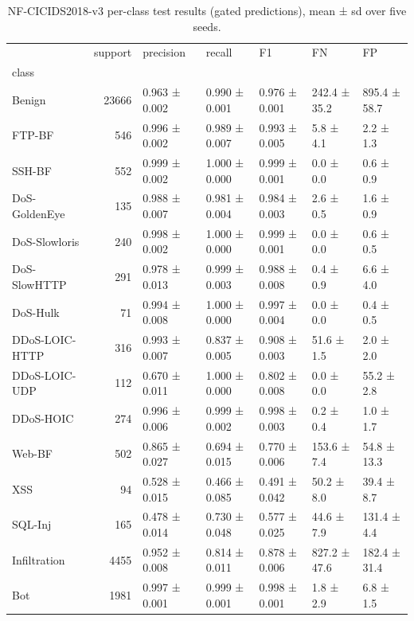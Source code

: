 \begin{table}
\caption{NF-CICIDS2018-v3 per-class test results (gated predictions), mean ± sd over five seeds.}
\label{tab:table2_per_class_gated}
\begin{tabular}{lrlllll}
\toprule
 & support & precision & recall & F1 & FN & FP \\
class &  &  &  &  &  &  \\
\midrule
Benign & 23666 & 0.963 ± 0.002 & 0.990 ± 0.001 & 0.976 ± 0.001 & 242.4 ± 35.2 & 895.4 ± 58.7 \\
FTP-BF & 546 & 0.996 ± 0.002 & 0.989 ± 0.007 & 0.993 ± 0.005 & 5.8 ± 4.1 & 2.2 ± 1.3 \\
SSH-BF & 552 & 0.999 ± 0.002 & 1.000 ± 0.000 & 0.999 ± 0.001 & 0.0 ± 0.0 & 0.6 ± 0.9 \\
DoS-GoldenEye & 135 & 0.988 ± 0.007 & 0.981 ± 0.004 & 0.984 ± 0.003 & 2.6 ± 0.5 & 1.6 ± 0.9 \\
DoS-Slowloris & 240 & 0.998 ± 0.002 & 1.000 ± 0.000 & 0.999 ± 0.001 & 0.0 ± 0.0 & 0.6 ± 0.5 \\
DoS-SlowHTTP & 291 & 0.978 ± 0.013 & 0.999 ± 0.003 & 0.988 ± 0.008 & 0.4 ± 0.9 & 6.6 ± 4.0 \\
DoS-Hulk & 71 & 0.994 ± 0.008 & 1.000 ± 0.000 & 0.997 ± 0.004 & 0.0 ± 0.0 & 0.4 ± 0.5 \\
DDoS-LOIC-HTTP & 316 & 0.993 ± 0.007 & 0.837 ± 0.005 & 0.908 ± 0.003 & 51.6 ± 1.5 & 2.0 ± 2.0 \\
DDoS-LOIC-UDP & 112 & 0.670 ± 0.011 & 1.000 ± 0.000 & 0.802 ± 0.008 & 0.0 ± 0.0 & 55.2 ± 2.8 \\
DDoS-HOIC & 274 & 0.996 ± 0.006 & 0.999 ± 0.002 & 0.998 ± 0.003 & 0.2 ± 0.4 & 1.0 ± 1.7 \\
Web-BF & 502 & 0.865 ± 0.027 & 0.694 ± 0.015 & 0.770 ± 0.006 & 153.6 ± 7.4 & 54.8 ± 13.3 \\
XSS & 94 & 0.528 ± 0.015 & 0.466 ± 0.085 & 0.491 ± 0.042 & 50.2 ± 8.0 & 39.4 ± 8.7 \\
SQL-Inj & 165 & 0.478 ± 0.014 & 0.730 ± 0.048 & 0.577 ± 0.025 & 44.6 ± 7.9 & 131.4 ± 4.4 \\
Infiltration & 4455 & 0.952 ± 0.008 & 0.814 ± 0.011 & 0.878 ± 0.006 & 827.2 ± 47.6 & 182.4 ± 31.4 \\
Bot & 1981 & 0.997 ± 0.001 & 0.999 ± 0.001 & 0.998 ± 0.001 & 1.8 ± 2.9 & 6.8 ± 1.5 \\
\bottomrule
\end{tabular}
\end{table}
